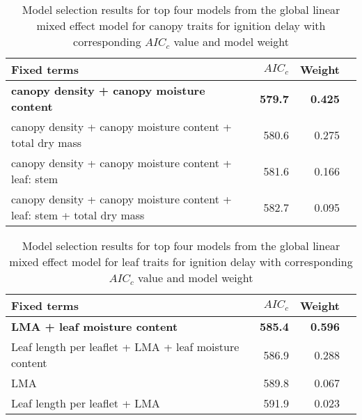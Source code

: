 \documentclass[12pt]{report}
\begin{document}


\begin{table}
  \centering
  \caption{Model selection results for top four models from the global linear
    mixed effect model for canopy traits for ignition delay with corresponding
    $AIC_{c}$ value and model weight}
  \begin{tabular}{lrrr}
    \toprule
    \textbf{Fixed terms} & $AIC_{c}$ & \textbf{Weight}\\
    \midrule
    \textbf{canopy density + canopy moisture content}    & \textbf{579.7} & \textbf{0.425} \\
    canopy density + canopy moisture content + total dry mass   & 580.6   & 0.275 \\
    canopy density + canopy moisture content + leaf: stem       & 581.6   & 0.166  \\
    canopy density + canopy moisture content + leaf: stem + total dry mass & 582.7  & 0.095 \\
    \bottomrule
  \end{tabular}
  \label{tab:canopy_models_ignition_delay}
\end{table}


\begin{table}
  \centering
  \caption{Model selection results for top four models from the global linear
    mixed effect model for leaf traits for ignition delay with corresponding
    $AIC_{c}$ value and model weight}
  \begin{tabular}{lrrr}
    \toprule
    \textbf{Fixed terms} & $AIC_{c}$ & \textbf{Weight}\\
    \midrule
    \textbf{LMA + leaf moisture content}    & \textbf{585.4} & \textbf{0.596} \\
    Leaf length per leaflet + LMA + leaf moisture content & 586.9          & 0.288          \\
    LMA                                                   & 589.8          & 0.067          \\
    Leaf length per leaflet + LMA                         & 591.9          & 0.023          \\
    \bottomrule
  \end{tabular}
  \label{tab:leaf_models_ignition_delay}
\end{table}



\end{document}
